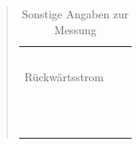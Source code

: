 \begin{quote}
\begin{table}[h]
\begin{addmargin}[-1cm]{3cm}
\begin{tabular}{|p{3cm}|p{3cm}|p{10.2cm}|}
                                 &           &                  \\
                                 &           &                  \\ 
                                 &           &                  \\
                                 &           &                  \\ 
                                 &           &                  \\
         \hline
         Rückwärtsstrom  &     &\\
                                 &           &                  \\ 
                                 &           &                  \\
                                 &           &                  \\ 
                                 &           &                  \\
                                 &           &                  \\ 
                                 &           &                  \\
                                 &           &                  \\ 
                                 &           &                  \\
                                 &           &                  \\ 
                                 &           &                  \\
                                 &           &                  \\ 
                                 &           &                  \\
         \hline
                     \end{tabular}
                  \end{addmargin}
             \caption{Sonstige Angaben zur Messung}
         \label{AngabenZurMessung}
      \end{table} 
      
      \noindent
      
       \vspace{2em}
      
\end{quote} %



